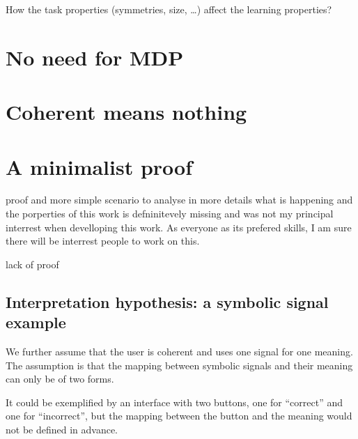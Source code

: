 How the task properties (symmetries, size, \ldots) affect the learning properties?

\section{No need for MDP}


\section{Coherent means nothing}


\section{A minimalist proof}

proof and more simple scenario to analyse in more details what is happening and the porperties of this work is defninitevely missing and was not my principal interrest when develloping this work. As everyone as its prefered skills, I am sure there will be interrest people to work on this.

lack of proof

\subsection{Interpretation hypothesis: a symbolic signal example}

We further assume that the user is coherent and uses one signal for one meaning. The assumption is that the mapping between symbolic signals and their meaning can only be of two forms.

It could be exemplified by an interface with two buttons, one for ``correct'' and one for ``incorrect'', but the mapping between the button and the meaning would not be defined in advance.

